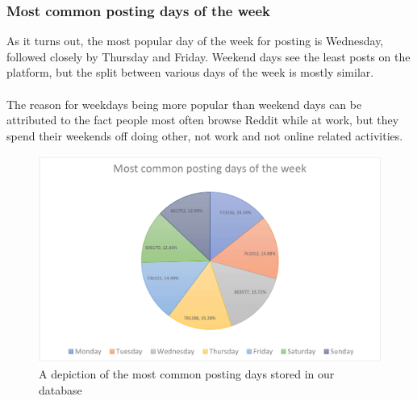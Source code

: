 \documentclass[openany]{article}
\begin{document}
\subsubsection{Most common posting days of the week}
As it turns out, the most popular day of the week for posting is Wednesday, followed closely by Thursday and Friday. Weekend days see the least posts on the platform, but the split between various days of the week is mostly similar. \\ \\
The reason for weekdays being more popular than weekend days can be attributed to the fact people most often browse Reddit while at work, but they spend their weekends off doing other, not work and not online related activities.
\begin{figure}[H]
    \centering
    \includegraphics[width=\textwidth]{postingdays.pdf}
    \caption{A depiction of the most common posting days stored in our database}
    \label{fig:mesh1}
\end{figure}
\end{document}
